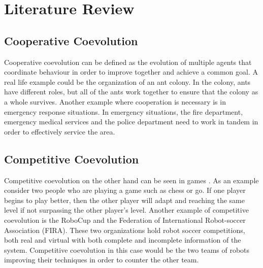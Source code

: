 
\section{Literature Review}

\subsection{Cooperative Coevolution}
Cooperative coevolution can be defined as the evolution of multiple agents that coordinate behaviour in order to improve together and achieve a common goal\cite{Yong}. A real life example could be the organization of an ant colony. In the colony, ants have different roles, but all of the ants work together to ensure that the colony as a whole survives. Another example where cooperation is necessary is in emergency response situations\cite{Runka}\cite{Hawe}. In emergency situations, the fire department, emergency medical services and the police department need to work in tandem in order to effectively service the area.

\subsection{Competitive Coevolution}
  Competitive coevolution on the other hand can be seen in games \cite{Rosin}\cite{coevolution-chess}\cite{Lubberts}. As an example consider two people who are playing a game such as chess or go. If one player begins to play better, then the other player will adapt and reaching the same level if not surpassing the other player's level. Another example of competitive coevolution is the RoboCup and the Federation of International Robot-soccer Association (FIRA)\cite{Scheepers-2013}. These two organizations hold robot soccer competitions, both real and virtual with both complete and incomplete information of the system. Competitive coevolution in this case would be the two teams of robots improving their techniques in order to counter the other team. 

